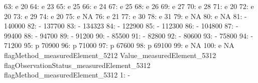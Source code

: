 \documentclass[nojss]{jss}
\begin{document}
\begin{Schunk}
\begin{Soutput}
 63:                               e                         20
 64:                               e                         23
 65:                               e                         25
 66:                               e                         24
 67:                               e                         25
 68:                               e                         26
 69:                               e                         27
 70:                               e                         28
 71:                               e                         20
 72:                               e                         20
 73:                               e                         29
 74:                               e                         20
 75:                               e                         NA
 76:                               e                         21
 77:                               e                         30
 78:                               e                         31
 79:                               e                         NA
 80:                               e                         NA
 81:                               -                     140000
 82:                               -                     137700
 83:                               -                     134323
 84:                               -                     122900
 85:                               -                     112300
 86:                               -                     104800
 87:                               -                      99400
 88:                               -                      94700
 89:                               -                      91200
 90:                               -                      85500
 91:                               -                      82800
 92:                               -                      80600
 93:                               -                      75800
 94:                               -                      71200
 95:                               p                      70900
 96:                               p                      71000
 97:                               p                      67600
 98:                               p                      69100
 99:                               e                         NA
100:                               e                         NA
     flagMethod_measuredElement_5212 Value_measuredElement_5312
     flagObservationStatus_measuredElement_5312 flagMethod_measuredElement_5312
  1:                                                                          -

\end{Soutput}
\end{Schunk}
\end{document}

